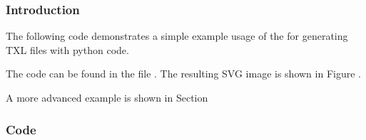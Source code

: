 \documentclass[letterpaper,10pt,english]{sphinxmanual}
\begin{document}
\subsubsection{Introduction}
\label{Chapters/20_Examples:id1}
The following code demonstrates a simple example usage of the  for
generating TXL files with python code.

The code can be found in the file .
The resulting SVG image is shown in Figure {\hyperref[Chapters/20_Examples:examplesimplesvg]{}}.

A more advanced example is shown in Section {\hyperref[Chapters/20_Examples:txlwizardexampleadvanced]{}}


\subsubsection{Code}
\label{Chapters/20_Examples:id2}
\end{document}
